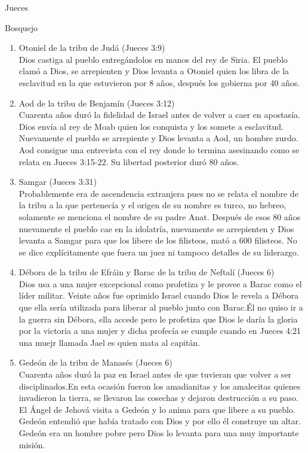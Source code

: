 \begin{section}{Jueces}
\begin{subsection}{Bosquejo}
\begin{enumerate}
\begin{enumerate}
						\item Otoniel de la tribu de Judá (Jueces 3:9)\\
							Dios castiga al pueblo entregándolos en manos del rey de Siria. El pueblo clamó a Dios, se arrepienten y Dios levanta a Otoniel quien los libra de la esclavitud en la que estuvieron por 8 años, después los gobierna por 40 años.
						\item Aod de la tribu de Benjamín (Jueces 3:12)\\
							Cuarenta años duró la fidelidad de Israel antes de volver a caer en apostasía. Dios envía al rey de Moab quien los conquista y los somete a esclavitud. Nuevamente el pueblo se arrepiente y Dios levanta a Aod, un hombre zurdo. Aod consigue una entrevista con el rey donde lo termina asesinando como se relata en Jueces 3:15-22. Su libertad posterior duró 80 años.
						\item Samgar (Jueces 3:31)\\
							Probablemente era de ascendencia extranjera pues no se relata el nombre de la tribu a la que pertenecía y el origen de su nombre es turco, no hebreo, solamente se menciona el nombre de su padre Anat. Después de esos 80 años nuevamente el pueblo cae en la idolatría, nuevamente se arrepienten y Dios levanta a Samgar para que los libere de los filisteos, mató a 600 filisteos. No se dice explícitamente que fuera un juez ni tampoco detalles de su liderazgo.
						\item Débora de la tribu de Efráin y Barac de la tribu de Neftalí (Jueces 6)\\
							Dios usa a una mujer excepcional como profetiza y le provee a Barac como el líder militar. Veinte años fue oprimido Israel cuando Dios le revela a Débora que ella sería utilizada para liberar al pueblo junto con Barac.\newpage Él no quiso ir a la guerra sin Débora, ella accede pero le profetiza que Dios le daría la gloria por la victoria a una mujer y dicha profecía se cumple cuando en Jueces 4:21 una muejr llamada Jael es quien mata al capitán.\\
						\item Gedeón de la tribu de Manasés (Jueces 6)\\
							Cuarenta años duró la paz en Israel antes de que tuvieran que volver a ser disciplinados.En esta ocasión fueron los amadianitas y los amalecitas quienes invadieron la tierra, se llevaron las cosechas y dejaron destrucción a su paso. El Ángel de Jehová visita a Gedeón y lo anima para que libere a su pueblo. Gedeón entendió que había tratado con Dios y por ello él construye un altar. Gedeón era un hombre pobre pero Dios lo levanta para una muy importante misión.\\

\end{enumerate}
\end{enumerate}
\end{subsection}
\end{section}
